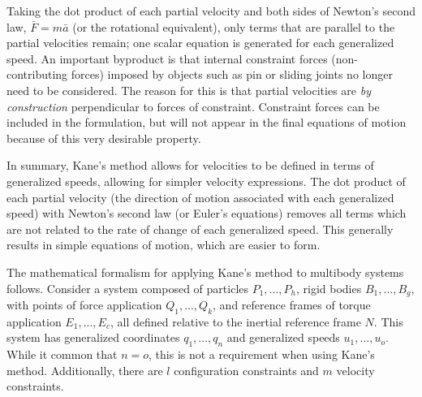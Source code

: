 \documentclass[smallcondensed,final]{svjour3}                     %
\begin{document}
Taking the dot product of each partial velocity and both sides of Newton's
second law, $\bar{F}=m\bar{a}$ (or the rotational equivalent), only terms that
are parallel to the partial velocities remain; one scalar equation is generated
for each generalized speed. An important byproduct is that internal constraint forces
(non-contributing forces) imposed by objects such as pin or sliding joints no
longer need to be considered. The reason for this is that partial velocities
are \textit{by construction} perpendicular to forces of constraint. Constraint
forces can be included in the formulation, but will not appear in the final
equations of motion because of this very desirable property.

In summary, Kane's method allows for velocities to be defined in terms of
generalized speeds, allowing for simpler velocity expressions.  The dot product
of each partial velocity (the direction of motion associated with each
generalized speed) with Newton's second law (or Euler's equations) removes all
terms which are not related to the rate of change of each generalized speed.
This generally results in simple equations of motion, which are easier to form.

The mathematical formalism for applying Kane's method to multibody systems
follows. Consider a system composed of particles $P_1,...,P_h$, rigid bodies
$B_1,...,B_g$, with points of force application $Q_1,...,Q_k$, and reference
frames of torque application $E_1,...,E_c$, all defined relative to the
inertial reference frame $N$. This system has generalized coordinates
$q_1,...,q_n$ and generalized speeds $u_1,...,u_o$.  While it common that $n =
o$, this is not a requirement when using Kane's method. Additionally, there are
$l$ configuration constraints and $m$ velocity constraints.
\end{document}
